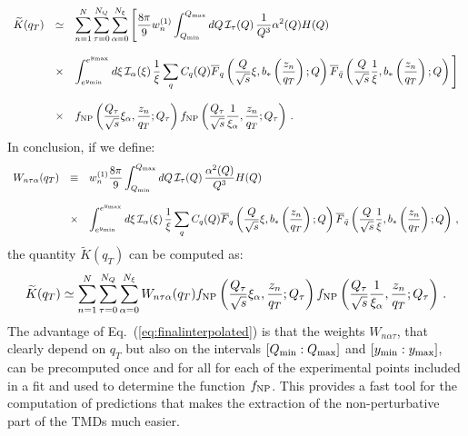 \documentclass[10pt,a4paper]{article}
\begin{document}
\begin{equation}
\begin{array}{rcl}
\displaystyle  \widetilde{K}(q_T) &\simeq& \displaystyle \sum_{n=1}^N
  \sum_{\tau=0}^{N_Q}\sum_{\alpha=0}^{N_\xi}\Bigg[\frac{8\pi}{9} w_n^{(1)}\int_{Q_{\rm min}}^{Q_{\rm max}}dQ\,\mathcal{I}_\tau(Q)\, 
  \frac{1}{Q^3} \alpha^2(Q) H(Q) 
\\
\\
&\times& \displaystyle 
                         \int_{e^{y_{\rm
    min}}}^{e^{y_{\rm max}}}d\xi\,\mathcal{I}_\alpha(\xi)\,\frac{1}{\xi} \sum_q C_q(Q)\overline{F}_q\left(\frac{Q}{\sqrt{s}}\xi,b_*\left(\frac{z_n}{q_T}\right);Q\right)
                         \overline{F}_{\bar{q}}\left(\frac{Q}{\sqrt{s}}\frac1{\xi},b_*\left(\frac{z_n}{q_T}\right);Q\right)\Bigg] \\
\\
&\times& \displaystyle f_{\rm NP}\left(\frac{Q_\tau}{\sqrt{s}}\xi_\alpha,\frac{z_n}{q_T};Q_\tau\right) f_{\rm NP}\left(\frac{Q_\tau}{\sqrt{s}}\frac1{\xi_\alpha},\frac{z_n}{q_T};Q_\tau\right)\,.
\end{array}
\end{equation}
In conclusion, if we define:
\begin{equation}\label{eq:weights}
\begin{array}{rcl}
  \displaystyle  W_{n\tau\alpha}(q_T) & \equiv & \displaystyle w_n^{(1)}\frac{8\pi}{9} \int_{Q_{\rm min}}^{Q_{\rm max}}dQ\,\mathcal{I}_\tau(Q)\, 
                                            \frac{\alpha^2(Q)}{Q^3} H(Q) 
                                            \\
  \\
                                 &\times& \displaystyle 
                                          \int_{e^{y_{\rm
                                          min}}}^{e^{y_{\rm max}}}d\xi\,\mathcal{I}_\alpha(\xi)\,\frac{1}{\xi} \sum_q C_q(Q)\overline{F}_q\left(\frac{Q}{\sqrt{s}}\xi,b_*\left(\frac{z_n}{q_T}\right);Q\right)
                                          \overline{F}_{\bar{q}}\left(\frac{Q}{\sqrt{s}}\frac1{\xi},b_*\left(\frac{z_n}{q_T}\right);Q\right)\,,
\end{array}
\end{equation}
the quantity $\widetilde{K}(q_T)$ can be computed as:
\begin{equation}\label{eq:finalinterpolated}
\widetilde{K}(q_T) \simeq \sum_{n=1}^N
  \sum_{\tau=0}^{N_Q}\sum_{\alpha=0}^{N_\xi} W_{n\tau\alpha}(q_T) f_{\rm NP}\left(\frac{Q_\tau}{\sqrt{s}}\xi_\alpha,\frac{z_n}{q_T};Q_\tau\right) f_{\rm NP}\left(\frac{Q_\tau}{\sqrt{s}}\frac1{\xi_\alpha},\frac{z_n}{q_T};Q_\tau\right)\,.
\end{equation}
The advantage of Eq.~(\ref{eq:finalinterpolated}) is that the weights
$W_{n\alpha\tau}$, that clearly depend on $q_T$ but also on the
intervals $[Q_{\rm min}:Q_{\rm max}]$ and $[y_{\rm min}:y_{\rm max}]$,
can be precomputed once and for all for each of the experimental
points included in a fit and used to determine the function
$f_{\rm NP}$.  This provides a fast tool for the computation of
predictions that makes the extraction of the non-perturbative part of
the TMDs much easier.
\end{document}
